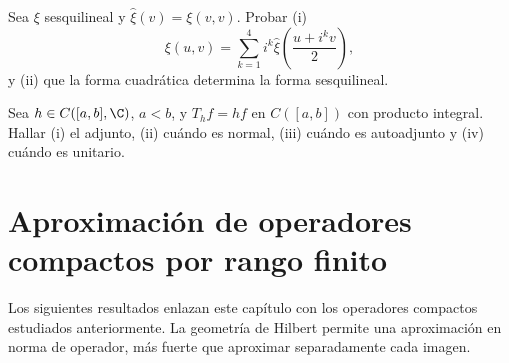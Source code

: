 \begin{ejercicio}\label{ej:lectura-32-9}
Sea $\xi$ sesquilineal y $\widehat\xi(v)=\xi(v,v)$. Probar (i)
\[
 \xi(u,v)=\sum_{k=1}^{4}i^k\widehat\xi\left(\frac{u+i^kv}{2}\right),
\]
y (ii) que la forma cuadrática determina la forma sesquilineal.
\end{ejercicio}


\begin{ejercicio}\label{ej:lectura-32-10}
Sea $h\in C([a,b],\C)$, $a<b$, y $T_hf=hf$ en $C([a,b])$ con producto integral. Hallar (i) el adjunto, (ii) cuándo es normal, (iii) cuándo es autoadjunto y (iv) cuándo es unitario.
\end{ejercicio}


\section{Aproximación de operadores compactos por rango finito}
Los siguientes resultados enlazan este capítulo con los operadores compactos estudiados anteriormente. La geometría de Hilbert permite una aproximación en norma de operador, más fuerte que aproximar separadamente cada imagen.

